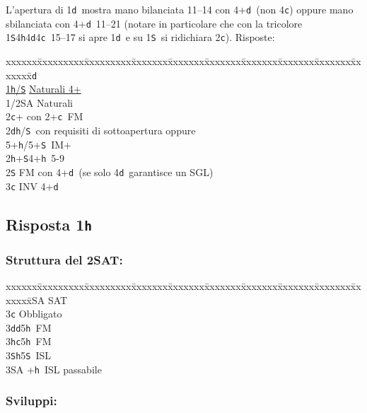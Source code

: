 \documentclass[a4paper,italian]{article}
\newcommand{\BS}{\small{\texttt{S}}}
\newcommand{\BC}{\small{\texttt{c}}}
\newcommand{\BD}{\small{\texttt{d}}}
\newcommand{\BH}{\small{\texttt{h}}}
\newcommand{\pdfh}{\texorpdfstring{\texttt{h}}{H}}
\newenvironment{bidtable}
{\begin{tabbing}

    xxxxxx\=xxxxxxxxx\=xxxxxxxxx\=xxxxxxx\=xxxxxxx\=xxxxxxx\=xxxxxxx\=xxxxxxx\=xxxxxxx\=xxxxxxx\=\kill}
{\end{tabbing} }%
\begin{document}
\begin{multicols}{2}
    L'apertura di 1\BD\ mostra mano bilanciata 11--14 con 4+\BD\ (non 4\BC ) oppure mano sbilanciata con 4+\BD\ 11--21 (notare in particolare che con la tricolore 1\BS 4\BH 4\BD 4\BC\ 15--17  si apre 1\BD\ e su 1\BS\ si ridichiara 2\BC ).
    Risposte:
    \begin{bidtable}
        1\BD\+\\
        \hyperref[fissaggi]{1\BH/\BS} \> \hyperref[fissaggi]{Naturali 4+}\\
        1/2\small{SA} \> Naturali\\
        2\BC {}+ con 2+\BC\ FM\\
        2\BD {}\BH /\BS\ con requisiti di sottoapertura oppure\+\\5+\BH /5+\BS\ IM+\-\\
        2\BH {}+\BS 4+\BH\ 5-9\\
        2\BS \> FM con 4+\BD\ (se solo 4\BD\ garantisce un SGL)\\
        3\BC \> INV 4+\BD \-
    \end{bidtable}
    \bigbreak

    \subsection{Risposta 1\pdfh}

    \subsubsection{Struttura del 2\small{SA}T:}

    \begin{bidtable}
        2\small{SA} \small{SA}T\+\\
        3\BC \> Obbligato\+\\
        3\BD {}\BD 5\BH\ FM\\
        3\BH {}\BC 5\BH\ FM\\
        3\BS {}\BH 5\BS\ ISL\\
        3\small{SA} +\BH\ ISL passabile\-\-
    \end{bidtable}

    \subsubsection{Sviluppi:}


\end{multicols}
\end{document}
